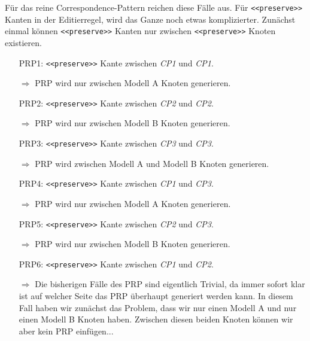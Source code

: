 Für das reine Correspondence-Pattern reichen diese Fälle aus. Für \texttt{<<preserve>>} Kanten in
der Editierregel, wird das Ganze noch etwas komplizierter. Zunächst einmal können
\texttt{<<preserve>>} Kanten nur zwischen \texttt{<<preserve>>} Knoten existieren.

\begin{enumerate}
  \item[PRP1:] \texttt{<<preserve>>} Kante zwischen \textit{CP1} und \textit{CP1}.

  $\Rightarrow$ PRP wird nur zwischen Modell A Knoten generieren.

  \item[PRP2:] \texttt{<<preserve>>} Kante zwischen \textit{CP2} und \textit{CP2}.
  
  $\Rightarrow$ PRP wird nur zwischen Modell B Knoten generieren.
  
  \item[PRP3:] \texttt{<<preserve>>} Kante zwischen \textit{CP3} und \textit{CP3}.

  $\Rightarrow$ PRP wird zwischen Modell A und Modell B Knoten generieren.

  \item[PRP4:] \texttt{<<preserve>>} Kante zwischen \textit{CP1} und \textit{CP3}.
  
  $\Rightarrow$ PRP wird nur zwischen Modell A Knoten generieren.
  
  \item[PRP5:] \texttt{<<preserve>>} Kante zwischen \textit{CP2} und \textit{CP3}.
  
  $\Rightarrow$ PRP wird nur zwischen Modell B Knoten generieren.
  
  \item[PRP6:] \texttt{<<preserve>>} Kante zwischen \textit{CP1} und \textit{CP2}.
  
   $\Rightarrow$ Die bisherigen Fälle des PRP sind eigentlich Trivial, da immer sofort klar ist auf
   welcher Seite das PRP überhaupt generiert werden kann. In diesem Fall haben wir zunächst das
   Problem, dass wir nur einen Modell A und nur einen Modell B Knoten haben. Zwischen diesen beiden
   Knoten können wir aber kein PRP einfügen...
   

\end{enumerate}
